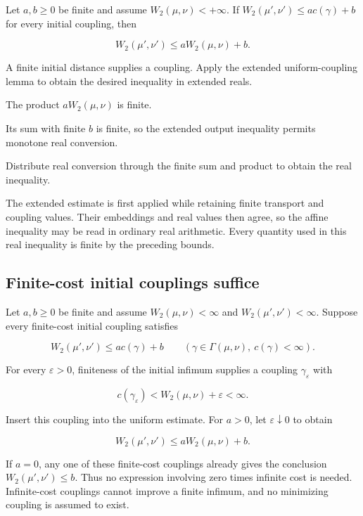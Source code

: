 \documentclass[11pt,a4paper]{report}
\begin{document}
Let \(a,b\ge0\) be finite and assume \(W_2(\mu,\nu)<+\infty\). If \(W_2(\mu',\nu')\le ac(\gamma)+b\) for every initial coupling, then

\[W_2(\mu',\nu')\le aW_2(\mu,\nu)+b.\]

A finite initial distance supplies a coupling. Apply the extended uniform-coupling lemma to obtain the desired inequality in extended reals.



The product \(aW_2(\mu,\nu)\) is finite.



Its sum with finite \(b\) is finite, so the extended output inequality permits monotone real conversion.



Distribute real conversion through the finite sum and product to obtain the real inequality.



The extended estimate is first applied while retaining finite transport and coupling values. Their embeddings and real values then agree, so the affine inequality may be read in ordinary real arithmetic. Every quantity used in this real inequality is finite by the preceding bounds.

\subsection{\texorpdfstring{Finite-cost initial couplings suffice}{Finite-cost initial couplings suffice}}
\label{report-step-UnadjustedLangevin-InitialCoupling-lean-4}


Let \(a,b\ge0\) be finite and assume \(W_2(\mu,\nu)<\infty\) and \(W_2(\mu',\nu')<\infty\). Suppose every finite-cost initial coupling satisfies

\[W_2(\mu',\nu')\le a c(\gamma)+b\qquad
(\gamma\in\Gamma(\mu,\nu),\ c(\gamma)<\infty).\]


For every \(\varepsilon>0\), finiteness of the initial infimum supplies a coupling \(\gamma_\varepsilon\) with

\[c(\gamma_\varepsilon)<W_2(\mu,\nu)+\varepsilon<\infty.\]


Insert this coupling into the uniform estimate. For \(a>0\), let \(\varepsilon\downarrow0\) to obtain

\[W_2(\mu',\nu')\le aW_2(\mu,\nu)+b.\]


If \(a=0\), any one of these finite-cost couplings already gives the conclusion \(W_2(\mu',\nu')\le b\). Thus no expression involving zero times infinite cost is needed. Infinite-cost couplings cannot improve a finite infimum, and no minimizing coupling is assumed to exist.
\end{document}

